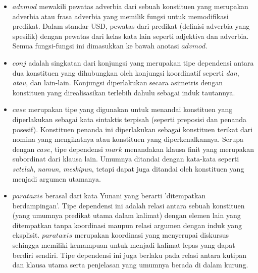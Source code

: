 \begin{itemize}
\item $advmod$ mewakili pewatas adverbia dari sebuah konstituen yang merupakan adverbia atau frasa adverbia yang memilik fungsi untuk memodifikasi predikat. Dalam standar USD, pewatas dari predikat (definisi adverbia yang spesifik) dengan pewatas dari kelas kata lain seperti adjektiva dan adverbia. Semua fungsi-fungsi ini dimasukkan ke bawah anotasi $advmod$. 
\item $conj$ adalah singkatan dari konjungsi yang merupakan tipe dependensi antara dua konstituen yang dihubungkan oleh konjungsi koordinatif seperti \textit{dan}, \textit{atau}, dan lain-lain. Konjungsi diperlakukan secara asimetris dengan konstituen yang direalisasikan terlebih dahulu sebagai induk tautannya.
\item $case$ merupakan tipe yang digunakan untuk menandai konstituen yang diperlakukan sebagai kata sintaktis terpisah (seperti preposisi dan penanda posesif). Konstituen penanda ini diperlakukan sebagai konstituen terikat dari nomina yang mengikatnya atau konstituen yang diperkenalkannya. Serupa dengan $case$, tipe dependensi $mark$ menandakan klausa finit yang merupakan subordinat dari klausa lain. Umumnya ditandai dengan kata-kata seperti \textit{setelah}, \textit{namun}, \textit{meskipun}, tetapi dapat juga ditandai oleh konstituen yang menjadi argumen utamanya.
\item $parataxis$ berasal dari kata Yunani yang berarti 'ditempatkan berdampingan'. Tipe dependensi ini adalah relasi antara sebuah konstituen (yang umumnya predikat utama dalam kalimat) dengan elemen lain yang ditempatkan tanpa koordinasi maupun relasi argumen dengan induk yang eksplisit. $parataxis$ merupakan koordinasi yang menyerupai diskursus sehingga memiliki kemampuan untuk menjadi kalimat lepas yang dapat berdiri sendiri. Tipe dependensi ini juga berlaku pada relasi antara kutipan dan klausa utama serta penjelasan yang umumnya berada di dalam kurung.
\end{itemize}


